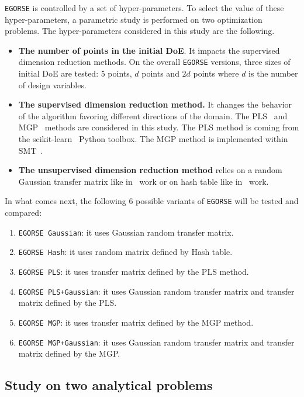 \texttt{EGORSE} is controlled by a set of hyper-parameters. To select the value of these hyper-parameters, a parametric study is performed on two optimization problems.
The hyper-parameters considered in this study are the following.
\begin{itemize}
    \item \textbf{The number of points in the initial DoE}. It impacts the supervised dimension reduction methods. On the overall \texttt{EGORSE} versions, three sizes of initial DoE are tested: 5 points, $d$ points and $2d$ points where $d$ is the number of design variables.
    \item \textbf{The supervised dimension reduction method.} It changes the behavior of the algorithm favoring different directions of the domain.
    The PLS~\cite{hellandStructurePartialLeast1988} and MGP~\cite{gardnerDiscoveringExploitingAdditive2017} methods are considered in this study. 
    The PLS method is coming from the scikit-learn~\cite{scikit-learn} Python toolbox. 
    The MGP method is implemented within SMT~\cite{bouhlelPythonSurrogateModeling2019}.
    \item \textbf{The unsupervised dimension reduction method} relies on a random Gaussian transfer matrix like in~\citet{binoisChoiceLowdimensionalDomain2020} work or on hash table like in~\citet{nayebiFrameworkBayesianOptimization2019} work.
\end{itemize}
In what comes next, the following 6 possible variants of \texttt{EGORSE} will be tested and compared:
\begin{enumerate}
    \item \texttt{EGORSE Gaussian}: it uses Gaussian random transfer matrix.
    \item  \texttt{EGORSE Hash}: it uses random matrix defined by Hash table.
    \item  \texttt{EGORSE PLS}: it uses transfer matrix defined by the PLS method.
    \item  \texttt{EGORSE PLS+Gaussian}: it uses Gaussian random transfer matrix and transfer matrix defined by the PLS.
    \item  \texttt{EGORSE MGP}: it uses transfer matrix defined by the MGP method.
    \item  \texttt{EGORSE MGP+Gaussian}: it uses Gaussian random transfer matrix and transfer matrix defined by the MGP.
\end{enumerate}
\subsection{Study on two analytical problems}
